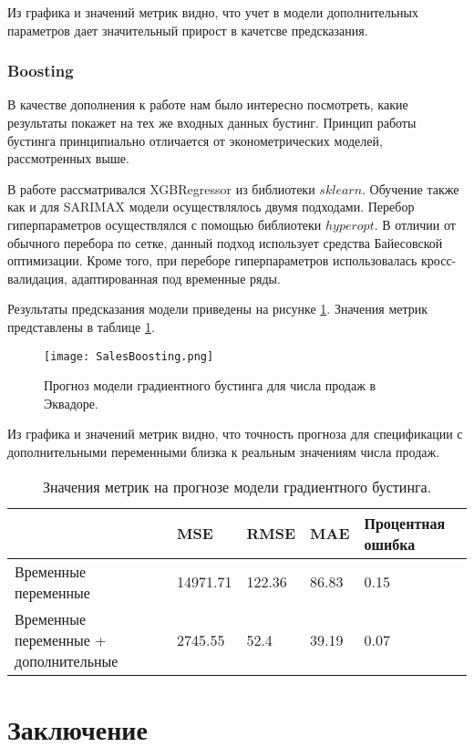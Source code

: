 \documentclass[]{article}
\begin{document}
Из графика и значений метрик видно, что учет в модели дополнительных параметров дает значительный прирост в качетсве предсказания.


\subsubsection{Boosting}

В качестве дополнения к работе нам было интересно посмотреть, какие результаты покажет на тех же входных данных бустинг. Принцип работы бустинга принципиально отличается от эконометрических моделей, рассмотренных выше. 

В работе рассматривался XGBRegressor из библиотеки $sklearn$. Обучение также как и для SARIMAX модели осуществлялось двумя подходами. Перебор гиперпараметров осуществлялся с помощью библиотеки $hyperopt$. В отличии от обычного перебора по сетке, данный подход использует средства Байесовской оптимизации. Кроме того, при переборе гиперпараметров использовалась кросс-валидация, адаптированная под временные ряды.

Результаты предсказания модели приведены на рисунке \ref{fig:boosting}. Значения метрик представлены в таблице  \ref{tab:boosting}.

\begin{figure}[h!]
	\centering
	\texttt{[image: SalesBoosting.png]}
	\caption{Прогноз модели градиентного бустинга для числа продаж в Эквадоре.}
	\label{fig:boosting}
\end{figure}

Из графика и значений метрик видно, что точность прогноза для спецификации с дополнительными переменными близка к реальным значениям числа продаж. 

\begin{table}[h]
	\centering
	\caption{Значения метрик на прогнозе модели градиентного бустинга.}
	\begin{tabularx}{\textwidth}{|X|l|l|l|l|}
		\hline
					& MSE          & RMSE   & MAE   & Процентная ошибка \\ \hline
		{Временные переменные}                  & 14971.71 & 122.36 & 86.83 & 0.15 \\ \hline
	    {Временные переменные + дополнительные} & 2745.55  & 52.4   & 39.19 & 0.07 \\ \hline
	\end{tabularx}
	\label{tab:boosting}
\end{table}

\newpage
\section{Заключение}
\end{document}
